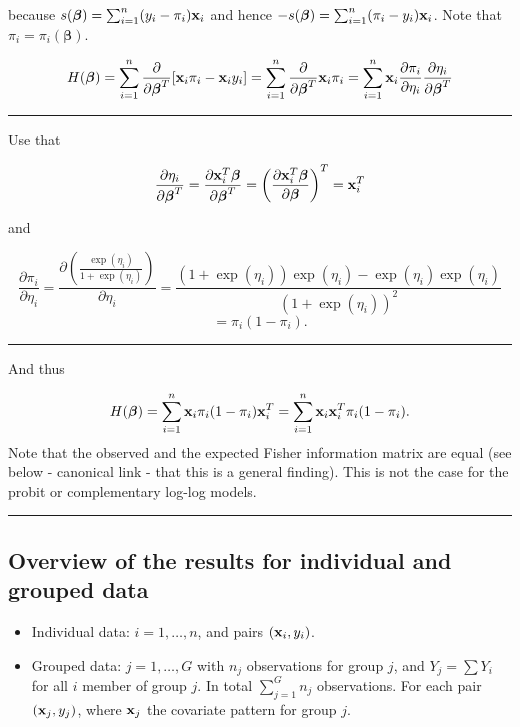 \documentclass[
]{article}
\providecommand{\tightlist}{%
  \setlength{\itemsep}{0pt}\setlength{\parskip}{0pt}}
\begin{document}
because \(s(\boldsymbol{\beta}) = \sum_{i=1}^n (y_i-\pi_i){\bf x}_i\)
and hence
\(-s(\boldsymbol{\beta}) = \sum_{i=1}^n (\pi_i-y_i){\bf x}_i\). Note
that \(\pi_i = \pi_i(\boldsymbol{\beta})\).

\[H(\boldsymbol{\beta}) = \sum_{i=1}^n \frac{\partial}{\partial\boldsymbol{\beta}^T}[{\bf x}_i\pi_i-{\bf x}_iy_i] = \sum_{i=1}^n \frac{\partial}{\partial\boldsymbol{\beta}^T}{\bf x}_i\pi_i = \sum_{i=1}^n {\bf x}_i \frac{\partial \pi_i}{\partial \eta_i} \frac{\partial \eta_i}{\partial \boldsymbol{\beta}^T} \]

\begin{center}\rule{0.5\linewidth}{0.5pt}\end{center}

Use that

\[ \frac{\partial \eta_i}{\partial \boldsymbol{\beta}^T}=\frac{\partial {\bf x}_i^T\boldsymbol{\beta}}{\partial \boldsymbol{\beta}^T} = \left(\frac{\partial {\bf x}_i^T\boldsymbol{\beta}}{\partial \boldsymbol{\beta}}\right)^T = {\bf x}_i^T \]

and

\[ \frac{\partial \pi_i}{\partial \eta_i} =  \frac{\partial\left(\frac{\exp(\eta_i)}{1+\exp(\eta_i)}\right)}{\partial \eta_i} = \frac{(1+\exp(\eta_i))\exp(\eta_i) - \exp(\eta_i)\exp(\eta_i)}{(1+\exp(\eta_i))^2} \]
\[=\pi_i (1-\pi_i).\]

\begin{center}\rule{0.5\linewidth}{0.5pt}\end{center}

And thus

\[H(\boldsymbol{\beta}) =\sum_{i=1}^n {\bf x}_i\pi_i(1-\pi_i) {\bf x}_i^T = \sum_{i=1}^n {\bf x}_i{\bf x}_i^T \pi_i(1-\pi_i).\]
Note that the observed and the expected Fisher information matrix are
equal (see below - canonical link - that this is a general finding).
This is not the case for the probit or complementary log-log models.

\begin{center}\rule{0.5\linewidth}{0.5pt}\end{center}

\hypertarget{overview-of-the-results-for-individual-and-grouped-data}{%
\subsection{Overview of the results for individual and grouped
data}\label{overview-of-the-results-for-individual-and-grouped-data}}

\begin{itemize}
\tightlist
\item
  Individual data: \(i=1,\ldots, n\), and pairs \(({\bf x}_i,y_i)\).
\item
  Grouped data: \(j=1,\ldots, G\) with \(n_j\) observations for group
  \(j\), and \(Y_j=\sum Y_i\) for all \(i\) member of group \(j\). In
  total \(\sum_{j=1}^G n_j\) observations. For each pair
  \(({\bf x}_j, y_j)\), where \({\bf x}_j\) the covariate pattern for
  group \(j\).
\end{itemize}
\end{document}
